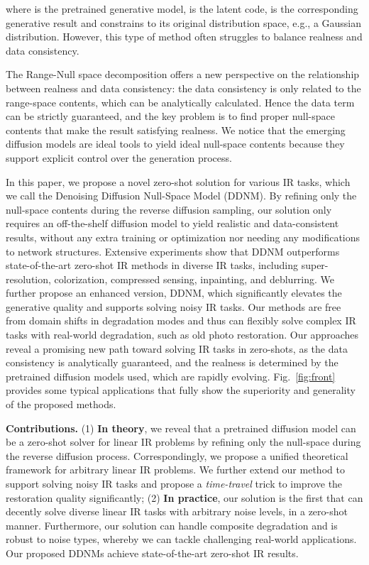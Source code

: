 \documentclass{article} \usepackage{iclr2023_conference,times}
\begin{document}
where  is the pretrained generative model,  is the latent code,  is the corresponding generative result and  constrains  to its original distribution space, e.g., a Gaussian distribution. However, this type of method often struggles to balance realness and data consistency.


The Range-Null space decomposition \citep{schwab2019deep,wang2022gan} offers a new perspective on the relationship between realness and data consistency: the data consistency is only related to the range-space contents, which can be analytically calculated. Hence the data term can be strictly guaranteed, and the key problem is to find proper null-space contents that make the result satisfying realness. We notice that the emerging diffusion models \citep{ho2020denoising,dhariwal2021diffusion} are ideal tools to yield ideal null-space contents because they support explicit control over the generation process.  

In this paper, we propose a novel zero-shot solution for various IR tasks, which we call the Denoising Diffusion Null-Space Model (DDNM). By refining only the null-space contents during the reverse diffusion sampling, our solution only requires an off-the-shelf diffusion model to yield realistic and data-consistent results, without any extra training or optimization nor needing any modifications to network structures. Extensive experiments show that DDNM outperforms state-of-the-art zero-shot IR methods in diverse IR tasks, including super-resolution, colorization, compressed sensing, inpainting, and deblurring. We further propose an enhanced version, DDNM, which significantly elevates the generative quality and supports solving noisy IR tasks. Our methods are free from domain shifts in degradation modes and thus can flexibly solve complex IR tasks with real-world degradation, such as old photo restoration. Our approaches reveal a promising new path toward solving IR tasks in zero-shots, as the data consistency is analytically guaranteed, and the realness is determined by the pretrained diffusion models used, which are rapidly evolving. Fig.~\ref{fig:front} provides some typical applications that fully show the superiority and generality of the proposed methods.

\textbf{Contributions.} (1) \textbf{In theory}, we reveal that a pretrained diffusion model can be a zero-shot solver for linear IR problems by refining only the null-space during the reverse diffusion process. Correspondingly, we propose a unified theoretical framework for arbitrary linear IR problems. We further extend our method to support solving noisy IR tasks and propose a \textit{time-travel} trick to improve the restoration quality significantly; (2) \textbf{In practice}, our solution is the first that can decently solve diverse linear IR tasks with arbitrary noise levels, in a zero-shot manner. Furthermore, our solution can handle composite degradation and is robust to noise types, whereby we can tackle challenging real-world applications. Our proposed DDNMs achieve state-of-the-art zero-shot IR results. 
\end{document}

